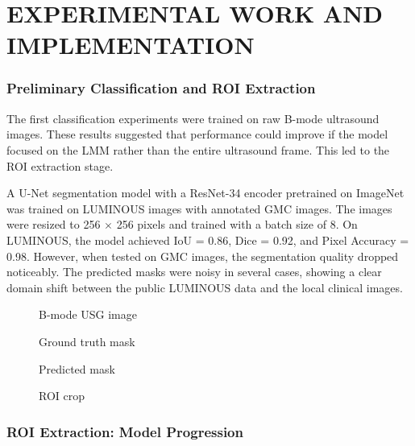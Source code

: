 \chapter{EXPERIMENTAL WORK AND IMPLEMENTATION}
\label{workdone}
\subsection{Preliminary Classification and ROI Extraction}
The first classification experiments were trained on raw B-mode ultrasound images. These results suggested that performance could improve if the model focused on the LMM rather than the entire ultrasound frame. This led to the ROI extraction stage.

A U-Net segmentation model with a ResNet-34 encoder pretrained on ImageNet was trained on LUMINOUS images with annotated GMC images. The images were resized to 256 $\times$ 256 pixels and trained with a batch size of 8. On LUMINOUS, the model achieved IoU = 0.86, Dice = 0.92, and Pixel Accuracy = 0.98. However, when tested on GMC images, the segmentation quality dropped noticeably. The predicted masks were noisy in several cases, showing a clear domain shift between the public LUMINOUS data and the local clinical images.

\begin{figure}[H]
\centering
{}
\caption{B-mode USG image}
\label{fig:bmode}
\end{figure}

\begin{figure}[H]
\centering
{}
\caption{Ground truth mask}
\label{fig:groundtruth}
\end{figure}

\begin{figure}[H]
\centering
{}
\caption{Predicted mask}
\label{fig:predmask}
\end{figure}

\begin{figure}[H]
\centering
{}
\caption{ROI crop}
\label{fig:roi}
\end{figure}

\subsection{ROI Extraction: Model Progression}
